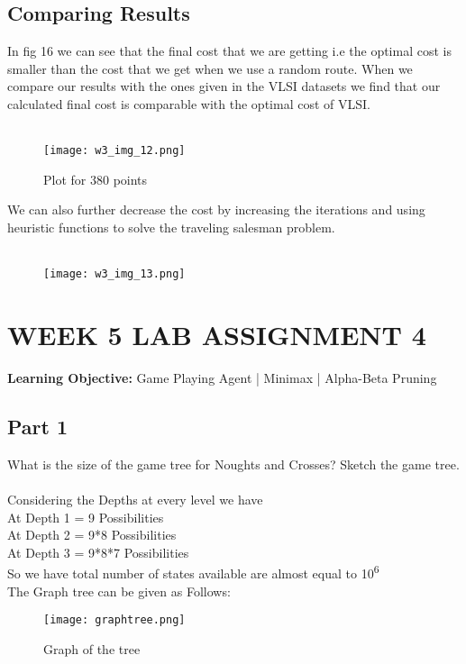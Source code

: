 \documentclass[conference]{IEEEtran}
\begin{document}
\subsection{Comparing Results}
In fig 16 we can see that the final cost that we are getting i.e the optimal cost is smaller than the cost that we get when we use a random route. When we compare our results with the ones given in the VLSI datasets we find that our calculated final cost is comparable with the optimal cost of VLSI.
\\
\\
\begin{figure}[htbp]
\centerline{\texttt{[image: w3\_img\_12.png]}}
\caption{Plot for 380 points}
\label{fig}
\end{figure}
We can also further decrease the cost by increasing the iterations and using heuristic functions to solve the traveling salesman problem.
\\
\\
\begin{figure}[htbp]
\centerline{\texttt{[image: w3\_img\_13.png]}}

\label{fig}
\end{figure}






\section{WEEK 5 LAB ASSIGNMENT 4}
\textbf{Learning Objective:} Game Playing Agent | Minimax |
Alpha-Beta Pruning

\subsection{Part 1}
What is the size of the game tree for Noughts and Crosses? Sketch the game tree.
\\
\\
Considering the Depths at every level we have
\\
At Depth 1 = 9 Possibilities
\\
At Depth 2 = 9*8 Possibilities
\\ 
At Depth 3 = 9*8*7 Possibilities
\\
So we have total number of states available are almost equal to 10\textsuperscript{6} 
\\
The Graph tree can be given as Follows:
\newline
\begin{figure}[htbp]
\centerline{\texttt{[image: graphtree.png]}}
\caption{Graph of the tree}
\label{fig}
\end{figure}
\\
\\
\end{document}

